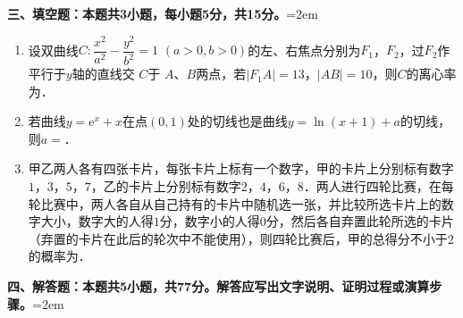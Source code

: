 \documentclass[UTF8,a4paper]{ctexart}
\newcommand{\e}{\mathrm{e}}
\begin{document}
\noindent\textbf{三、填空题：本题共3小题，每小题5分，共15分。}\hangindent=2em
\par\medskip




\begin{enumerate}[series=s2, leftmargin=2em, itemsep=0.8em]


\item
设双曲线$C:\dfrac{x^2}{a^2}-\dfrac{y^2}{b^2}=1$ $(a>0,b>0)$的左、右焦点分别为$F_1$，$F_2$，过$F_2$作平行于$y$轴的直线交 $C$于 $A$、$B$两点，若$\left|F_1A\right|=13$，$\left|AB\right|=10$，则$C$的离心率为\underline{\qquad\qquad}．




\item
若曲线$y=\e^x+x$在点$(0,1)$处的切线也是曲线$y=\ln(x+1)+a$的切线，则$a=$\underline{\qquad\qquad}．




\item
甲乙两人各有四张卡片，每张卡片上标有一个数字，甲的卡片上分别标有数字$1$，$3$，$5$，$7$，乙的卡片上分别标有数字$2$，$4$，$6$，$8$．两人进行四轮比赛，在每轮比赛中，两人各自从自己持有的卡片中随机选一张，并比较所选卡片上的数字大小，数字大的人得$1$分，数字小的人得$0$分，然后各自弃置此轮所选的卡片（弃置的卡片在此后的轮次中不能使用），则四轮比赛后，甲的总得分不小于$2$的概率为\underline{\qquad\qquad}．



\end{enumerate}
\vspace{1em}



\noindent\textbf{四、解答题：本题共5小题，共77分。解答应写出文字说明、证明过程或演算步骤。}\hangindent=2em
\par\medskip
\end{document}
